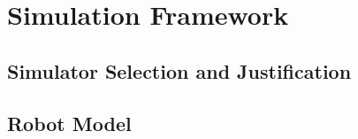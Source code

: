 
\chapter{Simulation Framework}
\label{chap:simulation}



\lipsum[25]

\section{Simulator Selection and Justification}



\lipsum[26]

\begin{criticalinsight}
\end{criticalinsight}

\section{Robot Model}




